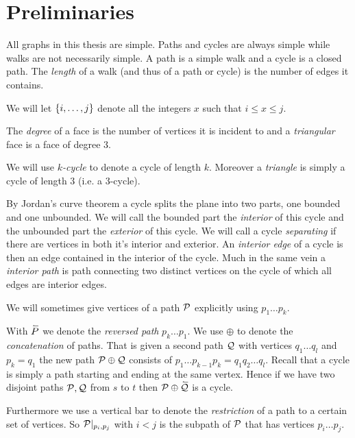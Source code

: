 
\section{Preliminaries}
All graphs in this thesis are simple. Paths and cycles are always simple while walks are not necessarily simple. A path is a simple walk and a cycle is a closed path.
The \emph{length} of a walk (and thus of a path or cycle) is the number of edges it contains.

We will let $\braces {i, \ldots, j}$ denote all the integers $x$ such that $i \leq x \leq j$.

The \emph{degree} of a face is the number of vertices it is incident to and a \emph{triangular} face is a face of degree $3$.

 We will use \emph{$k$-cycle} to denote a cycle of length $k$. Moreover a \emph{triangle} is simply a cycle of length $3$ (i.e. a $3$-cycle).

By Jordan's curve theorem a cycle splits the plane into two parts, one bounded and one unbounded. We will call the bounded part the \emph{interior} of this cycle and the unbounded part the \emph{exterior} of this cycle.
We will call a cycle \emph{separating} if there are vertices in both it's interior and exterior.
An \emph{interior edge} of a cycle is then an edge contained in the interior of the cycle. Much in the same vein a \emph{interior path} is path connecting two distinct vertices on the cycle of which all edges are interior edges.

  We will sometimes give vertices of a path $\P$ explicitly using $p_1 \ldots p_k$.

  With $\rev{P}$ we denote the \emph{reversed path} $p_k \ldots p_1$. We use $\oplus$ to denote the \emph{concatenation} of paths. That is given a second path $\Q$ with vertices $q_1 \ldots q_l$ and $p_k = q_1$ the new path $\P \oplus \Q$ consists of $p_1 \ldots p_{k-1} p_k=q_1 q_2 \ldots q_l$.
  Recall that a cycle is simply a path starting and ending at the same vertex. Hence if we have two disjoint paths $\P, \Q$ from $s$ to $t$ then $\P \oplus \rev{\Q}$ is a cycle.

  Furthermore we use a vertical bar to denote the \emph{restriction} of a path to a certain set of vertices. So $\P|_{p_i, p_j}$ with $i<j$ is the subpath of $\P$ that has vertices $p_i \ldots p_j$.

